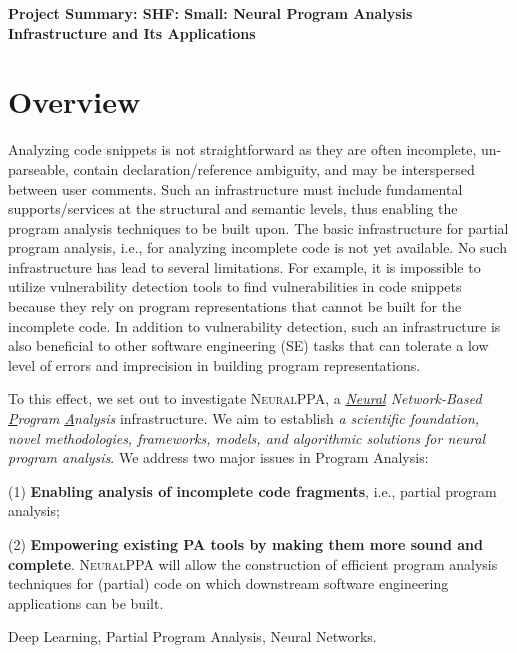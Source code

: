 \documentclass[11pt]{article}
\newcommand{\tool}{\textsc{NeuralPPA}\xspace}
\begin{document}



\begin{center}
  {\bf Project Summary: SHF: Small: Neural Program Analysis Infrastructure and Its Applications}
\end{center}
\vspace{-.1in}



\section{Overview}

Analyzing code snippets is not straightforward as they are often
incomplete, un-parseable, contain declaration/reference ambiguity, and
may be interspersed between user comments. Such an infrastructure must
include fundamental supports/services at the structural and semantic
levels, thus enabling the program analysis techniques to be built
upon. The basic infrastructure for partial program analysis, i.e., for
analyzing incomplete code is not yet available. No such infrastructure
has lead to several limitations. For example, it is impossible to
utilize vulnerability detection tools to find vulnerabilities in code
snippets because they rely on program representations that cannot be
built for the incomplete code. In addition to vulnerability detection,
such an infrastructure is also beneficial to other software
engineering (SE) tasks that can tolerate a low level of errors and
imprecision in building program representations.

To this effect, we set out to investigate {\tool}, a {\em \underline{Neural} Network-Based \underline{P}rogram \underline{A}nalysis} infrastructure. We aim to establish {\em a scientific foundation, novel methodologies, frameworks, models, and algorithmic solutions for neural program analysis}. We address two major issues in Program Analysis:

(1) {\bf Enabling analysis of incomplete code fragments}, i.e.,
partial program analysis;

(2) {\bf Empowering existing PA tools by making them more sound and
  complete}. {\tool} will allow the construction of efficient program
analysis techniques for (partial) code on which downstream software
engineering applications can be built.


 Deep Learning, Partial Program Analysis, Neural Networks.
\end{document}
